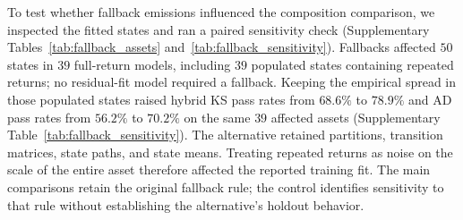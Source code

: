 To test whether fallback emissions influenced the composition
comparison, we inspected the fitted states and ran a paired
sensitivity check (Supplementary Tables~\ref{tab:fallback_assets} and~\ref{tab:fallback_sensitivity}). Fallbacks affected $50$ states in $39$ full-return
models, including $39$ populated states containing repeated returns;
no residual-fit model required a fallback. Keeping the empirical
spread in those populated states raised hybrid KS pass rates from
$68.6\%$ to $78.9\%$ and AD pass rates from $56.2\%$ to $70.2\%$
on the same $39$ affected assets (Supplementary Table~\ref{tab:fallback_sensitivity}). The alternative retained
partitions, transition matrices, state paths, and state means.
Treating repeated returns as noise on the scale of the entire asset
therefore affected the reported training fit. The main comparisons
retain the original fallback rule; the control identifies sensitivity
to that rule without establishing the alternative's holdout behavior.

